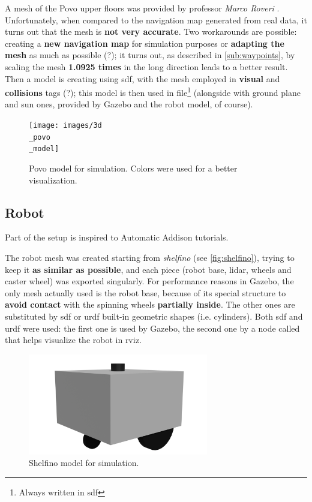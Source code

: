 A mesh of the Povo upper floors was provided by professor \textit{Marco Roveri} \cite{roveri}. Unfortunately, when compared to the navigation map generated from real data, it turns out that the mesh is \textbf{not very accurate}. Two workarounds are possible: creating a \textbf{new navigation map} for simulation purposes or \textbf{adapting the mesh} as much as possible (?); it turns out, as described in \autoref{sub:waypoints}, by scaling the mesh \textbf{1.0925 times} in the long direction leads to a better result. %
Then a model is creating using \acrfull{sdf}, with the mesh employed in \textbf{visual} and \textbf{collisions} tags (?); this model is then used in  file\footnote{Always written in \acrshort{sdf}} (alongside with ground plane and sun ones, provided by Gazebo and the robot model, of course).

\begin{figure}[h]
    \centering
    \texttt{[image: images/3d\\\_povo\\\_model]}
    \caption{Povo model for simulation. Colors were used for a better visualization.}
\end{figure}

\subsection{Robot}

Part of the setup is inspired to Automatic Addison tutorials\cite{tutorials}. %

The robot mesh was created starting from \textit{shelfino} (see \autoref{fig:shelfino}), trying to keep it \textbf{as similar as possible}, and each piece (robot base, lidar, wheels and caster wheel) was exported singularly. For performance reasons in Gazebo, the only mesh actually used is the robot base, because of its special structure to \textbf{avoid contact} with the spinning wheels \textbf{partially inside}. The other ones are substituted by \acrshort{sdf} or \acrfull{urdf} built-in geometric shapes (i.e. cylinders).
Both \acrshort{sdf} and \acrshort{urdf} were used: the first one is used by Gazebo, the second one by a node called  that helps visualize the robot in \acrshort{rviz}.

\begin{figure}[h]
    \centering
    \includegraphics[width=0.7\textwidth]{images/shelfino_3d.png}
    \caption{Shelfino model for simulation.}
\end{figure}

